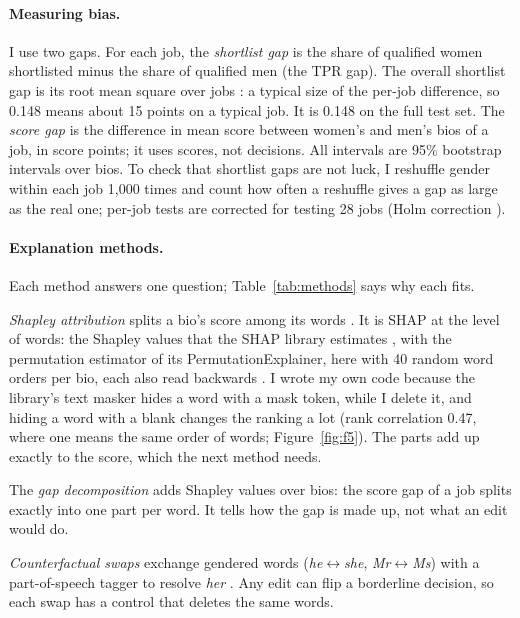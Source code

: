 \documentclass[11pt]{article}
\begin{document}
\paragraph{Measuring bias.} I use two gaps. For each job, the \emph{shortlist gap} is the share of qualified women shortlisted minus the share of qualified men (the TPR gap). The overall shortlist gap is its root mean square over jobs \citep{romanov2019name}: a typical size of the per-job difference, so 0.148 means about 15 points on a typical job. It is 0.148 on the full test set. The \emph{score gap} is the difference in mean score between women's and men's bios of a job, in score points; it uses scores, not decisions. All intervals are 95\% bootstrap intervals over bios. To check that shortlist gaps are not luck, I reshuffle gender within each job 1,000 times and count how often a reshuffle gives a gap as large as the real one; per-job tests are corrected for testing 28 jobs (Holm correction \citep{holm1979simple}).

\paragraph{Explanation methods.} Each method answers one question; Table~\ref{tab:methods} says why each fits.

\emph{Shapley attribution} splits a bio's score among its words \citep{shapley1953value}. It is SHAP at the level of words: the Shapley values that the SHAP library estimates \citep{lundberg2017unified}, with the permutation estimator of its PermutationExplainer, here with 40 random word orders per bio, each also read backwards \citep{strumbelj2014explaining}. I wrote my own code because the library's text masker hides a word with a mask token, while I delete it, and hiding a word with a blank changes the ranking a lot (rank correlation 0.47, where one means the same order of words; Figure~\ref{fig:f5}). The parts add up exactly to the score, which the next method needs.

The \emph{gap decomposition} adds Shapley values over bios: the score gap of a job splits exactly into one part per word. It tells how the gap is made up, not what an edit would do.

\emph{Counterfactual swaps} exchange gendered words (\emph{he}$\leftrightarrow$\emph{she}, \emph{Mr}$\leftrightarrow$\emph{Ms}) with a part-of-speech tagger to resolve \emph{her} \citep{kusner2017counterfactual}. Any edit can flip a borderline decision, so each swap has a control that deletes the same words.
\end{document}
